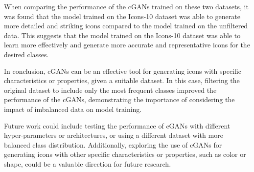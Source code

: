 \documentclass[conference]{IEEEtran}
\begin{document}
    When comparing the performance of the cGANs trained on these two datasets, it was found that the model trained on the Icons-10 dataset was able to generate more detailed and striking icons compared to the model trained on the unfiltered data.
    This suggests that the model trained on the Icons-10 dataset was able to learn more effectively and generate more accurate and representative icons for the desired classes.

    In conclusion, cGANs can be an effective tool for generating icons with specific characteristics or properties, given a suitable dataset.
    In this case, filtering the original dataset to include only the most frequent classes improved the performance of the cGANs, demonstrating the importance of considering the impact of imbalanced data on model training.

    Future work could include testing the performance of cGANs with different hyper-parameters or architectures, or using a different dataset with more balanced class distribution.
    Additionally, exploring the use of cGANs for generating icons with other specific characteristics or properties, such as color or shape, could be a valuable direction for future research.

    
    
\end{document}
